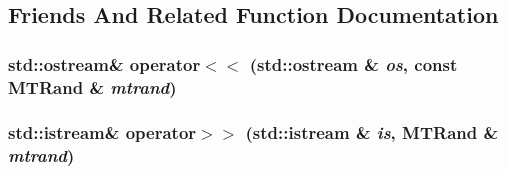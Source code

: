 \subsection{Friends And Related Function Documentation}
\hypertarget{classMTRand_a059061d50a1e54ee3067d4e1dbdd7c64}{
\subsubsection[{operator$<$$<$}]{\setlength{\rightskip}{0pt plus 5cm}std::ostream\& operator$<$$<$ (std::ostream \& {\em os}, \/  const {\bf MTRand} \& {\em mtrand})}}
\label{classMTRand_a059061d50a1e54ee3067d4e1dbdd7c64}
\hypertarget{classMTRand_a45b02a702835a3be42171c5c2dc79b2d}{
\subsubsection[{operator$>$$>$}]{\setlength{\rightskip}{0pt plus 5cm}std::istream\& operator$>$$>$ (std::istream \& {\em is}, \/  {\bf MTRand} \& {\em mtrand})}}
\label{classMTRand_a45b02a702835a3be42171c5c2dc79b2d}


